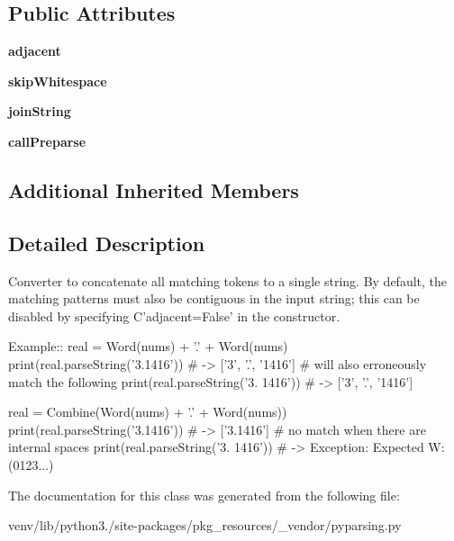 \subsection*{Public Attributes}
\begin{DoxyCompactItemize}
\item 
\mbox{\label{classpkg__resources_1_1__vendor_1_1pyparsing_1_1_combine_a0e0abea5e887aee659e6bde5492dc299}} 
{\bfseries adjacent}
\item 
\mbox{\label{classpkg__resources_1_1__vendor_1_1pyparsing_1_1_combine_a4a884d2357f17a68c1b3c478ca6885e6}} 
{\bfseries skip\+Whitespace}
\item 
\mbox{\label{classpkg__resources_1_1__vendor_1_1pyparsing_1_1_combine_a1221cf58a85aadbcb96b25fcdc2ff505}} 
{\bfseries join\+String}
\item 
\mbox{\label{classpkg__resources_1_1__vendor_1_1pyparsing_1_1_combine_a436a1ec3074f84feaa46942d708a43c8}} 
{\bfseries call\+Preparse}
\end{DoxyCompactItemize}
\subsection*{Additional Inherited Members}


\subsection{Detailed Description}
\begin{DoxyVerb}Converter to concatenate all matching tokens to a single string.
By default, the matching patterns must also be contiguous in the input string;
this can be disabled by specifying C{'adjacent=False'} in the constructor.

Example::
    real = Word(nums) + '.' + Word(nums)
    print(real.parseString('3.1416')) # -> ['3', '.', '1416']
    # will also erroneously match the following
    print(real.parseString('3. 1416')) # -> ['3', '.', '1416']

    real = Combine(Word(nums) + '.' + Word(nums))
    print(real.parseString('3.1416')) # -> ['3.1416']
    # no match when there are internal spaces
    print(real.parseString('3. 1416')) # -> Exception: Expected W:(0123...)
\end{DoxyVerb}
 

The documentation for this class was generated from the following file\+:\begin{DoxyCompactItemize}
\item 
venv/lib/python3./site-\/packages/pkg\+\_\+resources/\+\_\+vendor/pyparsing.\+py\end{DoxyCompactItemize}
